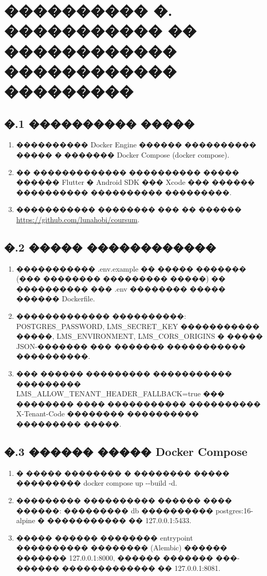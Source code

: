 \chapter{{\fontsize{14pt}{21pt}\selectfont\MakeUppercase{���������� �. ����������� �� ������������ ������������ ���������}}}
\label{app:deploy}

\section*{�.1 ���������� �����}

\begin{enumerate}
  \item ���������� Docker Engine ������ ���������� ����� � ������� Docker Compose (docker compose).
  \item �� ������������� ���������� ����� ������ Flutter � Android SDK ��� Xcode ��� ������ ���������� ���������� ���������.
  \item ����������� �������� ��� �� ������ \url{https://github.com/lunahobi/coursum}.
\end{enumerate}

\section*{�.2 ����� ������������}

\begin{enumerate}
  \item ����������� .env.example �� ����� ������� (��� �������� ��������� �����) �� ���������� ��� .env �������� ����� ������ Dockerfile.
  \item ������������� ����������: POSTGRES\_PASSWORD, LMS\_SECRET\_KEY ����������� �����, LMS\_ENVIRONMENT, LMS\_CORS\_ORIGINS � ����� JSON-������� ��� ������� ����������� ����������.
  \item ��� ������ ��������� ����������� ��������� LMS\_ALLOW\_TENANT\_HEADER\_FALLBACK=true ��� �������� ���� ����������� ���������� X-Tenant-Code �������� ���������� ��������� �����.
\end{enumerate}

\section*{�.3 ������ ����� Docker Compose}

\begin{enumerate}
  \item � ����� �������� � �������� ����� ��������� docker compose up {-}{-}build -d.
  \item ��������� ���������� ������ ���� ������: ��������� db ���������� postgres:16-alpine � ����������� �� 127.0.0.1:5433.
  \item ����� ������ �������� entrypoint ���������� �������� (Alembic) ������ ������� 127.0.0.1:8000, ������ ������� ���-������ ������������� �� 127.0.0.1:8081.
\end{enumerate}

